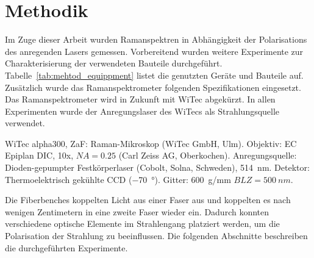 \documentclass[a4paper,12pt,twoside,parskip=no,headsepline,open=right,ngerman,export]{scrreprt}
\begin{document}
    
    \chapter{Methodik}
    
        Im Zuge dieser Arbeit wurden Ramanspektren in Abhängigkeit der Polarisations des anregenden Lasers gemessen. Vorbereitend wurden weitere Experimente zur Charakterisierung der verwendeten Bauteile durchgeführt. Tabelle~\ref{tab:mehtod_equippment} listet die genutzten Geräte und Bauteile auf. Zusätzlich wurde das Ramanspektrometer folgenden Spezifikationen eingesetzt. Das Ramanspektrometer wird in Zukunft mit WiTec abgekürzt. In allen Experimenten wurde der Anregungslaser des WiTecs als Strahlungsquelle verwendet.
        
        WiTec alpha300, ZaF: Raman-Mikroskop (WiTec GmbH, Ulm). Objektiv: EC Epiplan DIC, 10x, $N\!A = \num{0.25}$ (Carl Zeiss AG, Oberkochen). Anregungsquelle: Dioden-gepumpter Festkörperlaser (Cobolt, Solna, Schweden), \SI{514}{nm}. Detektor: Thermoelektrisch gekühlte CCD (\SI{-70}{\degree}). Gitter: \SI{600}{g/mm} $\mathit{BLZ}=\SI{500}{nm}$.
        
        Die Fiberbenches koppelten Licht aus einer Faser aus und koppelten es nach wenigen Zentimetern in eine zweite Faser wieder ein. Dadurch konnten verschiedene optische Elemente im Strahlengang platziert werden, um die Polarisation der Strahlung zu beeinflussen. Die folgenden Abschnitte beschreiben die durchgeführten Experimente.
        
\end{document}
